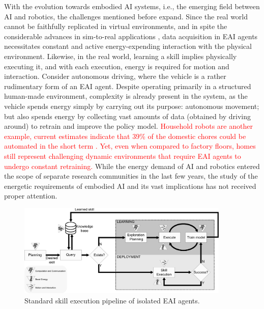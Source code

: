 With the evolution towards embodied AI systems, i.e., the emerging field between AI and robotics, the challenges mentioned before expand. Since the real world cannot be faithfully replicated in virtual environments, and in spite the considerable advances in sim-to-real applications \cite{Chebotar2019Closingsimreal}, data acquisition in EAI agents necessitates constant and active energy-expending interaction with the physical environment. Likewise, in the real world, learning a skill implies physically executing it, and with each execution, energy is required for motion and interaction. Consider autonomous driving, where the vehicle is a rather rudimentary form of an EAI agent. Despite operating primarily in a structured human-made environment, complexity is already present in the system, as the vehicle spends energy simply by carrying out its purpose: autonomous movement; but also spends energy by collecting vast amounts of data (obtained by driving around) to retrain and improve the policy model. \textcolor{red}{Household robots are another example, current estimates indicate that 39\% of the domestic chores could be automated in the short term \cite{Lehdonvirta2022futuresunpaidwork}. Yet, even when compared to factory floors, homes still represent challenging dynamic environments that require EAI agents to undergo constant retraining.} While the energy demand of AI and robotics entered the scope of separate research communities in the last few years, the study of the energetic requirements of embodied AI and its vast implications has not received proper attention. 
\begin{figure}[!t]
	\centering
	\includegraphics[width=0.9\textwidth]{fig/embodied_ai_learning_pipeline_v7.pdf}
	\caption{Standard skill execution pipeline of isolated EAI agents.}
	\label{fig:embodied_ai_pipeline}
\end{figure}

